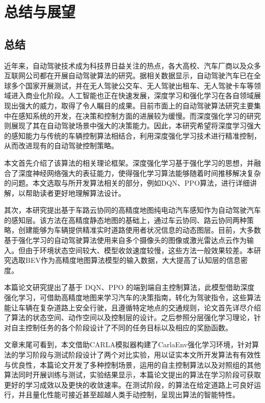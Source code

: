 
\chapter{总结与展望}

\section{总结}

近年来，自动驾驶技术成为科技界日益关注的热点，各大高校、汽车厂商以及众多互联网公司都在开展自动驾驶算法的研究。据相关数据显示，自动驾驶汽车已在全球多个国家开展测试，并在无人驾驶公交车、无人驾驶出租车、无人驾驶卡车等领域进入商业化阶段。人工智能也正在快速发展，深度学习和强化学习在各自领域展现出强大的威力，取得了令人瞩目的成果。目前市面上的自动驾驶算法研究主要集中在感知系统的开发，在决策和控制方面的进展较为缓慢。而深度强化学习的研究则展现了其在自动驾驶场景中强大的决策能力。因此，本研究希望将深度学习强大的感知能力与传统的车辆控制算法相结合，利用深度强化学习技术进行精准控制，从而改进现有的自动驾驶控制策略。

本文首先介绍了该算法的相关理论框架。深度强化学习基于强化学习的思想，并融合了深度神经网络强大的表征能力，使得强化学习算法能够随着时间推移解决复杂的问题。本文选取与所开发算法相关的部分，例如DQN、PPO算法，进行详细讲解，以帮助读者更好地理解算法设计。

其次，本研究提出基于车路云协同的高精度地图纯电动汽车感知作为自动驾驶汽车的感知层。该方法在高精度静态地图的基础上，通过车云协同、路云协同两种策略，创建能够为车辆提供精准实时道路使用者状况信息的动态图层。目前，大多数基于强化学习的自动驾驶算法使用来自多个摄像头的图像或激光雷达点云作为输入。但由于环境状态空间较大、模型收敛速度较慢，这些方法一般效果较差。本研究选取BEV作为高精度地图算法模型的输入数据，大大提高了认知层的信息密度。

本篇论文研究提出了基于 DQN、PPO 的端到端自主控制算法，此模型借助深度强化学习，可借助高精度地图来学习汽车的决策指南，转化为驾驶指令，这些算法能让车辆在复杂道路上安全行驶，且遵循特定地点的交通规则，论文首先详尽介绍了算法的状态空间、动作空间以及控制层的设计。之后参照分层强化学习理论，针对自主控制任务的各个阶段设计了不同的任务目标以及相应的奖励函数。

文章末尾可看到，本文借助CARLA模拟器构建了CarlaEnv强化学习环境，针对算法的学习阶段与测试阶段设计了两个对比实验，用以证实本文所开发算法有有效性与优良性，本篇论文开发了多种控制场景，运用的自主控制算法以及对照组的其他算法同时开展训练与测试，实验结果显示，本篇论文提出的算法在学习阶段可获取更好的学习成效以及更快的收敛速率。在测试阶段，的算法在给定道路上可良好运行，并且量化性能可接近甚至超越人类手动控制，呈现出算法的智能特性。

